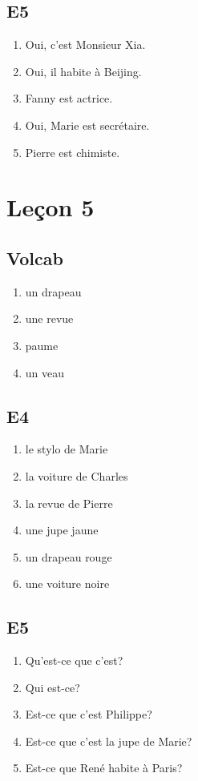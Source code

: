 \documentclass{book}
\begin{document}
    \section{E5}
        \begin{enumerate}
            \item Oui, c'est Monsieur Xia.
            \item Oui, il habite à Beijing.
            \item Fanny est actrice.
            \item Oui, Marie est secrétaire.
            \item Pierre est chimiste.
        \end{enumerate}

\chapter{Leçon 5}
    \section{Volcab}
        \begin{enumerate}
            \item un drapeau
            \item une revue
            \item paume
            \item un veau
        \end{enumerate}

    \section{E4}
        \begin{enumerate}
            \item le stylo de Marie
            \item la voiture de Charles
            \item la revue de Pierre 
            \item une jupe jaune 
            \item un drapeau rouge
            \item une voiture noire
        \end{enumerate}
        
    \section{E5}
        \begin{enumerate}
            \item Qu'est-ce que c'est?
            \item Qui est-ce?
            \item Est-ce que c'est Philippe?
            \item Est-ce que c'est la jupe de Marie?
            \item Est-ce que René habite à Paris?
        \end{enumerate}
    
\end{document}
